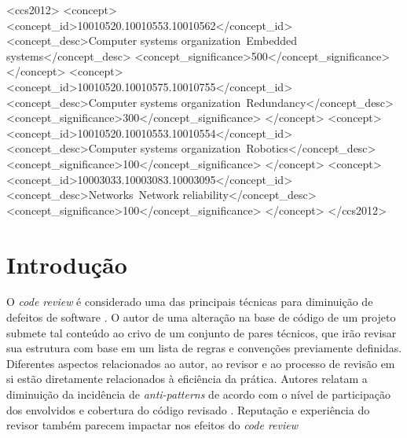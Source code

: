 \documentclass[sigconf]{acmart}
\begin{document}
%
%
\begin{CCSXML}
<ccs2012>
 <concept>
  <concept_id>10010520.10010553.10010562</concept_id>
  <concept_desc>Computer systems organization~Embedded systems</concept_desc>
  <concept_significance>500</concept_significance>
 </concept>
 <concept>
  <concept_id>10010520.10010575.10010755</concept_id>
  <concept_desc>Computer systems organization~Redundancy</concept_desc>
  <concept_significance>300</concept_significance>
 </concept>
 <concept>
  <concept_id>10010520.10010553.10010554</concept_id>
  <concept_desc>Computer systems organization~Robotics</concept_desc>
  <concept_significance>100</concept_significance>
 </concept>
 <concept>
  <concept_id>10003033.10003083.10003095</concept_id>
  <concept_desc>Networks~Network reliability</concept_desc>
  <concept_significance>100</concept_significance>
 </concept>
</ccs2012>
\end{CCSXML}





\maketitle

\section{Introdução}

O \textit{code review} é considerado uma das principais técnicas para diminuição de defeitos de software \cite{Boehm2001}. O autor de uma alteração na base de código de um projeto submete tal conteúdo ao crivo de um conjunto de pares técnicos, que irão revisar sua estrutura com base em um lista de regras e convenções previamente definidas. Diferentes aspectos relacionados ao autor, ao revisor e ao processo de revisão em si estão diretamente relacionados à eficiência da prática. Autores relatam a diminuição da incidência de \textit{anti-patterns} \cite{Kemerer2009} de acordo com o nível de participação dos envolvidos e cobertura do código revisado \cite{Meneely201437, Morales2015171, Bavota201581}. Reputação \cite{Baysal2013122, Bosu2014} e experiência \cite{Kononenko2015111} do revisor também parecem impactar nos efeitos do \textit{code review}
\end{document}
